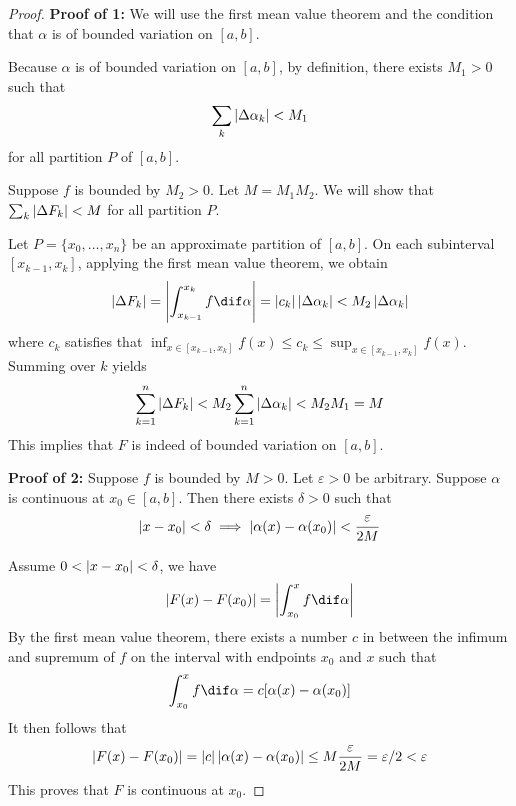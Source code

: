 \documentclass[thmcnt=section, color=blue, 12pt]{my-elegantbook}
\begin{document}
\begin{proof}
	\noindent\textbf{Proof of 1:} We will use the first mean value theorem
	and the condition that $\alpha$ is of bounded variation on $[a, b]$.

	Because $\alpha$ is of bounded variation on $[a, b]$, by definition,
	there exists $M_1 > 0$ such that
	\begin{align*}
		\sum_{k} \left\lvert \Delta \alpha_k \right\rvert < M_1
	\end{align*}
	for all partition $P$ of $[a, b]$.

	Suppose $f$ is bounded by $M_2 > 0$.
	Let $M = M_1 M_2$.
	We will show that $\sum_{k} \left\lvert \Delta F_k \right\rvert < M$ for all partition $P$.

	Let $P = \{x_0, \ldots, x_n\}$ be an approximate partition of $[a, b]$.
	On each subinterval $[x_{k-1}, x_k]$,
	applying the first mean value theorem, we obtain
	\begin{align*}
		\abs{\Delta F_k} = \abs{\int_{x_{k-1}}^{x_k} f \dif \alpha}
		= \abs{ c_k } \abs{ \Delta \alpha_k }
		< M_2 \abs{\Delta \alpha_k}
	\end{align*}
	where $c_k$ satisfies
	that $\inf_{x\in[x_{k-1}, x_k]} f(x) \leq c_k \leq \sup_{x\in[x_{k-1}, x_k]} f(x)$.
	Summing over $k$ yields
	\begin{align*}
		\sum_{k=1}^n \left\lvert \Delta F_k \right\rvert < M_2 \sum_{k=1}^n \left\lvert \Delta \alpha_k \right\rvert
		< M_2 M_1 = M
	\end{align*}
	This implies that $F$ is indeed of bounded variation on $[a, b]$.

	\noindent\textbf{Proof of 2:}
	Suppose $f$ is bounded by $M > 0$.
	Let $\varepsilon > 0$ be arbitrary.
	Suppose  $\alpha$ is continuous at $x_0 \in [a, b]$.
	Then there exists $\delta > 0$ such
	that
	\begin{align*}
		\left\lvert x - x_0 \right\rvert < \delta
		\implies \left\lvert \alpha(x) - \alpha(x_0) \right\rvert < \frac{\varepsilon}{2M}
	\end{align*}

	Assume $0 < \left\lvert x - x_0 \right\rvert < \delta$, we have
	\begin{align*}
		\abs{F(x) - F(x_0)}
		= \abs{\int_{x_0}^x f \dif \alpha}
	\end{align*}
	By the first mean value theorem,
	there exists a number $c$ in between the infimum and supremum of $f$
	on the interval with endpoints $x_0$ and $x$ such that
	\begin{align*}
		\int_{x_0}^x f \dif \alpha = c [\alpha(x) - \alpha(x_0)]
	\end{align*}
	It then follows that
	\begin{align*}
		\left\lvert F(x) - F(x_0) \right\rvert = \left\lvert c \right\rvert \left\lvert \alpha(x) - \alpha(x_0) \right\rvert
		\leq M \frac{\varepsilon}{2M} = \varepsilon / 2< \varepsilon
	\end{align*}
	This proves that $F$ is continuous at $x_0$.


\end{proof}
\end{document}
